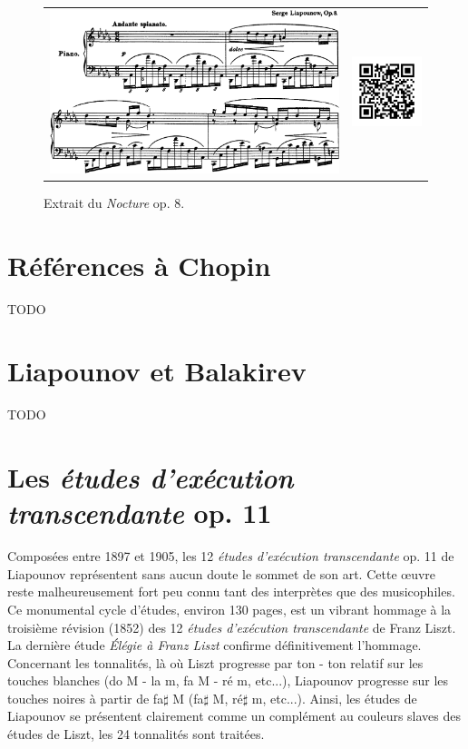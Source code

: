\begin{figure}[!p]
  \begin{bigcenter}
    \begin{tabular}{lr}
      \includegraphics[width=12.5cm, keepaspectratio]{op8.png}
      &
      \includegraphics[width=3cm, keepaspectratio]{op8-qr.png}
    \end{tabular}
  \end{bigcenter}
  \caption{\label{op3}Extrait du \emph{Nocture} op. 8.}
\end{figure}

\section{Références à Chopin}

TODO

\section{Liapounov et Balakirev}

TODO

\newpage
\newpage

\section{Les \emph{études d'exécution transcendante} op. 11}

Composées entre 1897 et 1905, les 12 \emph{études d'exécution transcendante} op. 11 de Liapounov représentent sans aucun doute le sommet de son art. Cette œuvre reste malheureusement fort peu connu tant des interprètes que des musicophiles. Ce monumental cycle d'études, environ 130 pages, est un vibrant hommage à la troisième révision (1852) des 12 \emph{études d'exécution transcendante} de Franz Liszt. La dernière étude \emph{Élégie à Franz Liszt} confirme définitivement l'hommage. Concernant les tonnalités, là où Liszt progresse par ton - ton relatif sur les touches blanches (do M - la m, fa M - ré m, etc...), Liapounov progresse sur les touches noires à partir de fa$\sharp$ M (fa$\sharp$ M, ré$\sharp$ m, etc...). Ainsi, les études de Liapounov se présentent clairement comme un complément au couleurs slaves des études de Liszt, les 24 tonnalités sont traitées.

